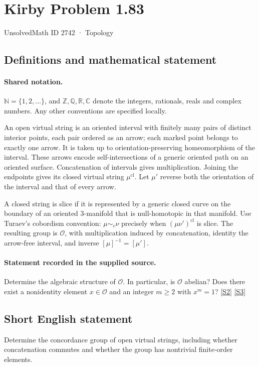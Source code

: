 \documentclass[11pt]{article}
\newcommand{\sref}[2]{\hyperlink{source:#1:#2}{[S#2]}}
\begin{document}
\setcounter{section}{2741}
\section{Kirby Problem 1.83}\label{2742}
{\small\sffamily UnsolvedMath ID 2742 · Topology}
\subsection{Definitions and mathematical statement}

\paragraph{Shared notation.}$\mathbb N=\{1,2,\ldots\}$, and $\mathbb Z,\mathbb Q,\mathbb R,\mathbb C$ denote the integers, rationals, reals and complex numbers. Any other conventions are specified locally.


An open virtual string is an oriented interval with finitely many pairs of distinct interior points, each pair ordered as an arrow; each marked point belongs to exactly one arrow. It is taken up to orientation-preserving homeomorphism of the interval. These arrows encode self-intersections of a generic oriented path on an oriented surface. Concatenation of intervals gives multiplication. Joining the endpoints gives its closed virtual string $\mu^{\mathrm{cl}}$. Let $\mu'$ reverse both the orientation of the interval and that of every arrow.

A closed string is slice if it is represented by a generic closed curve on the boundary of an oriented 3-manifold that is null-homotopic in that manifold. Use Turaev's cobordism convention: $\mu\sim_c\nu$ precisely when $(\mu\nu')^{\mathrm{cl}}$ is slice. The resulting group is $\mathcal O$, with multiplication induced by concatenation, identity the arrow-free interval, and inverse $[\mu]^{-1}=[\mu']$.
\paragraph{Statement recorded in the supplied source.}
Determine the algebraic structure of $\mathcal O$. In particular, is $\mathcal O$ abelian? Does there exist a nonidentity element $x\in\mathcal O$ and an integer $m\ge2$ with $x^m=1$? \sref{2742}{2} \sref{2742}{3}

\subsection{Short English statement}
Determine the concordance group of open virtual strings, including whether concatenation commutes and whether the group has nontrivial finite-order elements.
\end{document}
